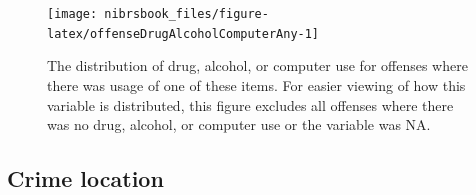 \documentclass[
  12pt,
  openany]{book}
\begin{document}
\begin{figure}

{\centering \texttt{[image: nibrsbook\_files/figure-latex/offenseDrugAlcoholComputerAny-1]} 

}

\caption{The distribution of drug, alcohol, or computer use for offenses where there was usage of one of these items. For easier viewing of how this variable is distributed, this figure excludes all offenses where there was no drug, alcohol, or computer use or the variable was NA.}\label{fig:offenseDrugAlcoholComputerAny}
\end{figure}

\hypertarget{crime-location}{%
\subsection{Crime location}\label{crime-location}}
\end{document}
